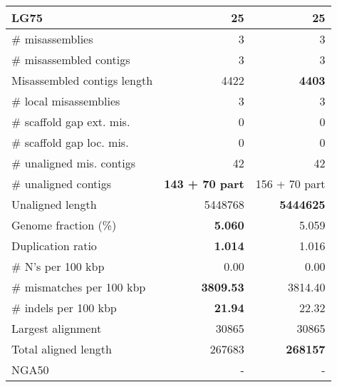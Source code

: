\documentclass[12pt,a4paper]{article}
\begin{document}
\begin{table}[ht]
\begin{center}
\begin{tabular}{|l*{2}{|r}|}
LG75 & 25 & 25 \\ \hline
\# misassemblies & 3 & 3 \\ \hline
\# misassembled contigs & 3 & 3 \\ \hline
Misassembled contigs length & 4422 & {\bf 4403} \\ \hline
\# local misassemblies & 3 & 3 \\ \hline
\# scaffold gap ext. mis. & 0 & 0 \\ \hline
\# scaffold gap loc. mis. & 0 & 0 \\ \hline
\# unaligned mis. contigs & 42 & 42 \\ \hline
\# unaligned contigs & {\bf 143 + 70 part} & 156 + 70 part \\ \hline
Unaligned length & 5448768 & {\bf 5444625} \\ \hline
Genome fraction (\%) & {\bf 5.060} & 5.059 \\ \hline
Duplication ratio & {\bf 1.014} & 1.016 \\ \hline
\# N's per 100 kbp & 0.00 & 0.00 \\ \hline
\# mismatches per 100 kbp & {\bf 3809.53} & 3814.40 \\ \hline
\# indels per 100 kbp & {\bf 21.94} & 22.32 \\ \hline
Largest alignment & 30865 & 30865 \\ \hline
Total aligned length & 267683 & {\bf 268157} \\ \hline
NGA50 & - & - \\ \hline
\end{tabular}
\end{center}
\end{table}
\end{document}
